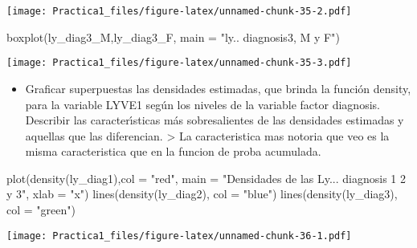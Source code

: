 \documentclass[
]{article}
\newenvironment{Shaded}{\begin{snugshade}}{\end{snugshade}}
\newcommand{\AttributeTok}[1]{\textcolor[rgb]{0.77,0.63,0.00}{#1}}
\newcommand{\FunctionTok}[1]{\textcolor[rgb]{0.00,0.00,0.00}{#1}}
\newcommand{\NormalTok}[1]{#1}
\newcommand{\StringTok}[1]{\textcolor[rgb]{0.31,0.60,0.02}{#1}}
\providecommand{\tightlist}{%
  \setlength{\itemsep}{0pt}\setlength{\parskip}{0pt}}
\begin{document}
\texttt{[image: Practica1\_files/figure-latex/unnamed-chunk-35-2.pdf]}

\begin{Shaded}
\begin{Highlighting}[]
\FunctionTok{boxplot}\NormalTok{(ly\_diag3\_M,ly\_diag3\_F, }\AttributeTok{main =} \StringTok{"ly.. diagnosis3, M y F"}\NormalTok{)}
\end{Highlighting}
\end{Shaded}

\texttt{[image: Practica1\_files/figure-latex/unnamed-chunk-35-3.pdf]}

\begin{itemize}
\tightlist
\item
  Graficar superpuestas las densidades estimadas, que brinda la función
  density, para la variable LYVE1 según los niveles de la variable
  factor diagnosis. Describir las caracterı́sticas más sobresalientes de
  las densidades estimadas y aquellas que las diferencian.
  \textgreater{} La caracteristica mas notoria que veo es la misma
  caracteristica que en la funcion de proba acumulada.
\end{itemize}

\begin{Shaded}
\begin{Highlighting}[]
\FunctionTok{plot}\NormalTok{(}\FunctionTok{density}\NormalTok{(ly\_diag1),}\AttributeTok{col =} \StringTok{"red"}\NormalTok{, }\AttributeTok{main =} \StringTok{"Densidades de las Ly... diagnosis 1 2 y 3"}\NormalTok{, }\AttributeTok{xlab =} \StringTok{"x"}\NormalTok{)}
\FunctionTok{lines}\NormalTok{(}\FunctionTok{density}\NormalTok{(ly\_diag2), }\AttributeTok{col =} \StringTok{"blue"}\NormalTok{)}
\FunctionTok{lines}\NormalTok{(}\FunctionTok{density}\NormalTok{(ly\_diag3), }\AttributeTok{col =} \StringTok{"green"}\NormalTok{)}
\end{Highlighting}
\end{Shaded}

\texttt{[image: Practica1\_files/figure-latex/unnamed-chunk-36-1.pdf]}
\end{document}
